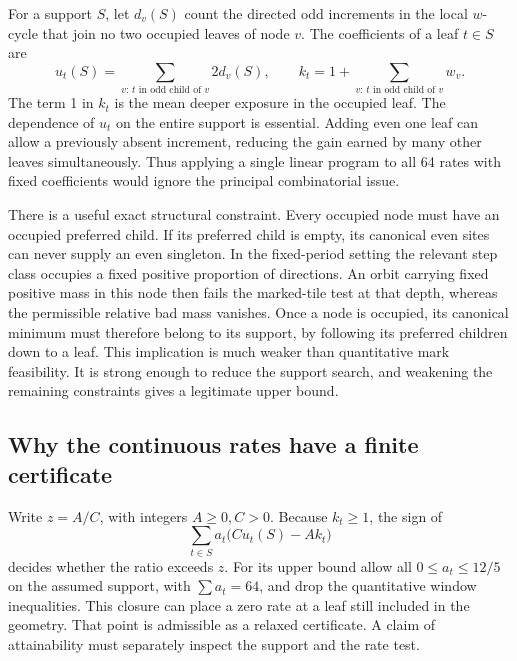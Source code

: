 For a support \(S\), let \(d_v(S)\) count the directed odd increments in the local \(w\)-cycle that join no two occupied leaves of node \(v\). The coefficients of a leaf \(t\in S\) are
\[
    u_t(S)=\sum_{v:\,t\text{ in odd child of }v} 2d_v(S),
    \qquad k_t=1+\sum_{v:\,t\text{ in odd child of }v}w_v .
\]
The term 1 in \(k_t\) is the mean deeper exposure in the occupied leaf. The dependence of \(u_t\) on the entire support is essential. Adding even one leaf can allow a previously absent increment, reducing the gain earned by many other leaves simultaneously. Thus applying a single linear program to all 64 rates with fixed coefficients would ignore the principal combinatorial issue.

There is a useful exact structural constraint. Every occupied node must have an occupied preferred child. If its preferred child is empty, its canonical even sites can never supply an even singleton. In the fixed-period setting the relevant step class occupies a fixed positive proportion of directions. An orbit carrying fixed positive mass in this node then fails the marked-tile test at that depth, whereas the permissible relative bad mass vanishes. Once a node is occupied, its canonical minimum must therefore belong to its support, by following its preferred children down to a leaf. This implication is much weaker than quantitative mark feasibility. It is strong enough to reduce the support search, and weakening the remaining constraints gives a legitimate upper bound.

\subsection{Why the continuous rates have a finite certificate}

Write \(z=A/C\), with integers \(A\geq0,C>0\). Because \(k_t\ge1\), the sign of
\[
           \sum_{t\in S} a_t\bigl(Cu_t(S)-Ak_t\bigr)
\]
decides whether the ratio exceeds \(z\). For its upper bound allow all \(0\le a_t\le12/5\) on the assumed support, with \(\sum a_t=64\), and drop the quantitative window inequalities. This closure can place a zero rate at a leaf still included in the geometry. That point is admissible as a relaxed certificate. A claim of attainability must separately inspect the support and the rate test.

